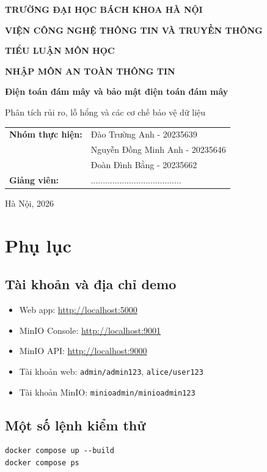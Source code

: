 \documentclass[12pt,a4paper]{report}
\begin{document}
\begin{titlepage}
    \centering
    {\bfseries\Large TRƯỜNG ĐẠI HỌC BÁCH KHOA HÀ NỘI\par}
    \vspace{0.3cm}
    {\bfseries\large VIỆN CÔNG NGHỆ THÔNG TIN VÀ TRUYỀN THÔNG\par}
    \vspace{2.2cm}
    {\bfseries\Large TIỂU LUẬN MÔN HỌC\par}
    \vspace{0.4cm}
    {\bfseries\Large NHẬP MÔN AN TOÀN THÔNG TIN\par}
    \vspace{1.8cm}
    {\bfseries\LARGE Điện toán đám mây và bảo mật điện toán đám mây\par}
    \vspace{0.4cm}
    {\Large Phân tích rủi ro, lỗ hổng và các cơ chế bảo vệ dữ liệu\par}
    \vspace{2cm}
    \begin{tabular}{ll}
        \textbf{Nhóm thực hiện:} & Đào Trường Anh - 20235639 \\
                                & Nguyễn Đồng Minh Anh - 20235646 \\
                                & Đoàn Đình Bằng - 20235662 \\
        \textbf{Giảng viên:}    & ...................................... \\
    \end{tabular}
    \vfill
    {\large Hà Nội, 2026\par}
\end{titlepage}

\tableofcontents
\listoffigures
\listoftables
\clearpage










\nocite{*}



\appendix
\chapter{Phụ lục}
\section{Tài khoản và địa chỉ demo}
\begin{itemize}
    \item Web app: \url{http://localhost:5000}
    \item MinIO Console: \url{http://localhost:9001}
    \item MinIO API: \url{http://localhost:9000}
    \item Tài khoản web: \texttt{admin/admin123}, \texttt{alice/user123}
    \item Tài khoản MinIO: \texttt{minioadmin/minioadmin123}
\end{itemize}

\section{Một số lệnh kiểm thử}
\begin{lstlisting}
docker compose up --build
docker compose ps
\end{lstlisting}
\end{document}
